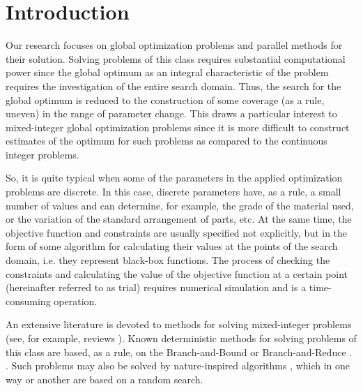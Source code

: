 \documentclass[
11pt,%
tightenlines,%
twoside,%
onecolumn,%
nofloats,%
nobibnotes,%
nofootinbib,%
superscriptaddress,%
noshowpacs,%
centertags]%
{revtex4}
\begin{document}

\section{Introduction}

Our research focuses on global optimization problems and parallel methods for their solution. Solving problems of this class requires substantial computational power since the global optimum as an integral characteristic of the problem requires the investigation of the entire search domain. Thus, the search for the global optimum is reduced to the construction of some coverage (as a rule, uneven) in the range of parameter change. This draws a particular interest to mixed-integer global optimization problems since it is more difficult to construct estimates of the optimum for such problems as compared to the continuous integer problems. 

So, it is quite typical when some of the parameters in the applied optimization problems are discrete. In this case, discrete parameters have, as a rule, a small number of values and can determine, for example, the grade of the material used, or the variation of the standard arrangement of parts, etc.
At the same time, the objective function and constraints are usually specified not explicitly, but in the form of some algorithm for calculating their values at the points of the search domain, i.e. they represent black-box functions. The process of checking the constraints and calculating the value of the objective function at a certain point (hereinafter referred to as trial) requires numerical simulation and is a time-consuming operation. 

An extensive literature is devoted to methods for solving mixed-integer problems (see, for example, reviews \cite{Burer,Boukouvala}). Known deterministic methods for solving problems of this class are based, as a rule, on the Branch-and-Bound \cite{Belotti} or Branch-and-Reduce \cite{Vigerske}. . Such problems may also be solved by nature-inspired algorithms \cite{Deep,Schluter}, which in one way or another are based on a random search.
\end{document}

